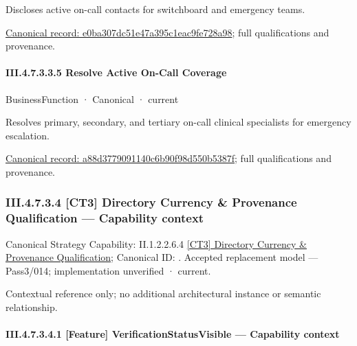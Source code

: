 Discloses active on-call contacts for switchboard and emergency teams.


{\footnotesize \href{../../../../../../../../continuum/business/business-service/e0ba307dc51e47a395c1eac9fe728a98.md}{Canonical record: e0ba307dc51e47a395c1eac9fe728a98}; full qualifications and provenance.}\par
\paragraph*{III.4.7.3.3.5 Resolve Active On-Call Coverage}
\label{navigation:III.4.7.3.3.5}

\label{element:a88d3779091140c6b90f98d550b5387f}
{\small BusinessFunction · Canonical · current}\par

Resolves primary, secondary, and tertiary on-call clinical specialists for emergency escalation.


{\footnotesize \href{../../../../../../../../continuum/business/business-function/a88d3779091140c6b90f98d550b5387f.md}{Canonical record: a88d3779091140c6b90f98d550b5387f}; full qualifications and provenance.}\par
\subsubsection*{III.4.7.3.4 [CT3] Directory Currency \& Provenance Qualification — Capability context}
\label{navigation:III.4.7.3.4}

{\small Canonical Strategy Capability: II.1.2.2.6.4 \hyperref[element:21e0c3d5b39b4d6c9c082241150f1f09]{[CT3] Directory Currency \& Provenance Qualification}; Canonical ID: \texttt{}. Accepted replacement model — Pass3/014; implementation unverified · current.}\par
Contextual reference only; no additional architectural instance or semantic relationship.\par
\paragraph*{III.4.7.3.4.1 [Feature] VerificationStatusVisible — Capability context}
\label{navigation:III.4.7.3.4.1}

